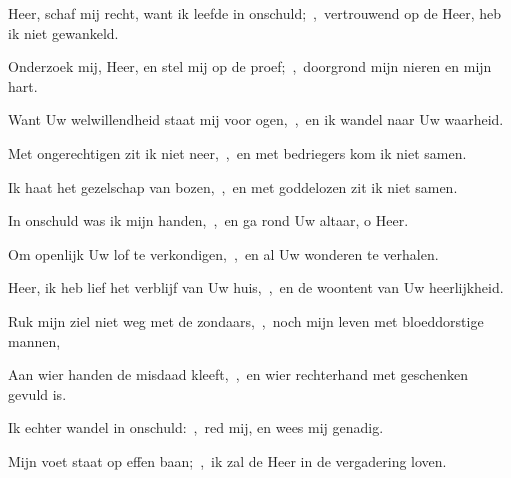 \documentclass[12pt,twoside,a5paper]{article}
\begin{document}
\begin{halfparskip}
   Heer, schaf mij recht, want ik leefde in onschuld;~\sep\ vertrouwend op de Heer, heb ik niet gewankeld.

  Onderzoek mij, Heer, en stel mij op de proef;~\sep\ doorgrond mijn nieren en mijn hart.

  Want Uw welwillendheid staat mij voor ogen,~\sep\ en ik wandel naar Uw waarheid.

  Met ongerechtigen zit ik niet neer,~\sep\ en met bedriegers kom ik niet samen.

  Ik haat het gezelschap van bozen,~\sep\ en met goddelozen zit ik niet samen.

  In onschuld was ik mijn handen,~\sep\ en ga rond Uw altaar, o Heer.

  Om openlijk Uw lof te verkondigen,~\sep\ en al Uw wonderen te verhalen.

  Heer, ik heb lief het verblijf van Uw huis,~\sep\ en de woontent van Uw heerlijkheid.

  Ruk mijn ziel niet weg met de zondaars,~\sep\ noch mijn leven met bloeddorstige mannen,

  Aan wier handen de misdaad kleeft,~\sep\ en wier rechterhand met geschenken gevuld is.

  Ik echter wandel in onschuld:~\sep\ red mij, en wees mij genadig.

  Mijn voet staat op effen baan;~\sep\ ik zal de Heer in de vergadering loven.
\end{halfparskip}
\end{document}

